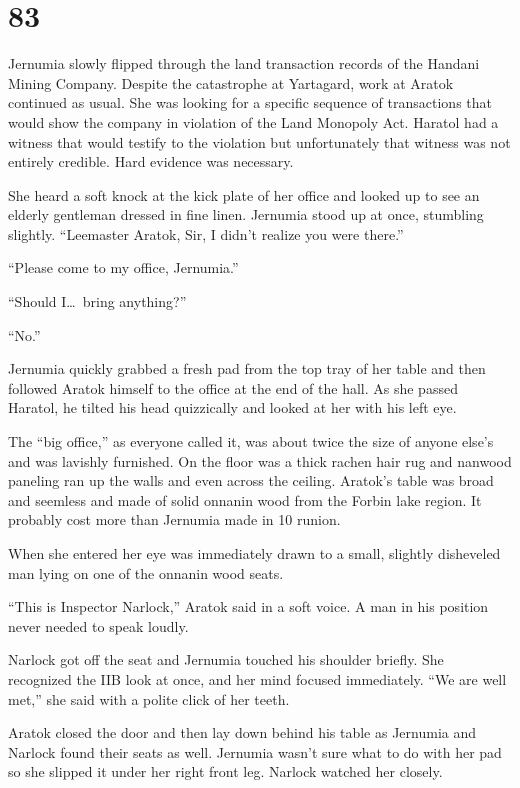 
\chapter{83}

Jernumia slowly flipped through the land transaction records of the Handani Mining Company.
Despite the catastrophe at Yartagard, work at Aratok continued as usual. She was looking for a
specific sequence of transactions that would show the company in violation of the Land Monopoly
Act. Haratol had a witness that would testify to the violation but unfortunately that witness
was not entirely credible. Hard evidence was necessary.

She heard a soft knock at the kick plate of her office and looked up to see an elderly gentleman
dressed in fine linen. Jernumia stood up at once, stumbling slightly. ``Leemaster Aratok, Sir, I
didn't realize you were there.''

``Please come to my office, Jernumia.''

``Should I\ldots\ bring anything?''

``No.''

Jernumia quickly grabbed a fresh pad from the top tray of her table and then followed Aratok
himself to the office at the end of the hall. As she passed Haratol, he tilted his head
quizzically and looked at her with his left eye.

The ``big office,'' as everyone called it, was about twice the size of anyone else's and was
lavishly furnished. On the floor was a thick rachen hair rug and nanwood paneling ran up the
walls and even across the ceiling. Aratok's table was broad and seemless and made of solid
onnanin wood from the Forbin lake region. It probably cost more than Jernumia made in 10 runion.

When she entered her eye was immediately drawn to a small, slightly disheveled man lying on one
of the onnanin wood seats.

``This is Inspector Narlock,'' Aratok said in a soft voice. A man in his position never needed
to speak loudly.

Narlock got off the seat and Jernumia touched his shoulder briefly. She recognized the IIB look
at once, and her mind focused immediately. ``We are well met,'' she said with a polite click of
her teeth.

Aratok closed the door and then lay down behind his table as Jernumia and Narlock found their
seats as well. Jernumia wasn't sure what to do with her pad so she slipped it under her right
front leg. Narlock watched her closely.

